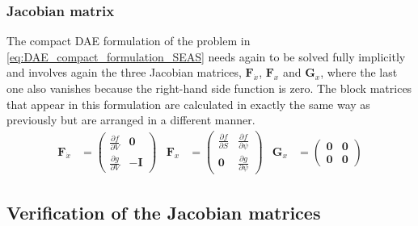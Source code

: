 \subsubsection{Jacobian matrix}
The compact DAE formulation of the problem in \autoref{eq:DAE_compact_formulation_SEAS} needs again to be solved fully implicitly and involves again the three Jacobian matrices, $\mathbf{F}_{\dot{x}}$, $\mathbf{F}_x$ and $\mathbf{G}_x$, where the last one also vanishes because the right-hand side function is zero. The block matrices that appear in this formulation are calculated in exactly the same way as previously but are arranged in a different manner.
\begin{align}
	\label{eq:Jacobian_compact_DAE}
	\mathbf{F}_{\dot{x}}&=  \begin{pmatrix}
								\frac{\partial f}{\partial V} &  \mathbf{0} \\
							    \frac{\partial g}{\partial V} & -\mathbf{I}
							\end{pmatrix} & 
	\mathbf{F}_x        &=  \begin{pmatrix}
								\frac{\partial f}{\partial S} & \frac{\partial f}{\partial \psi} \\
								\mathbf{0}                    & \frac{\partial g}{\partial \psi}
							\end{pmatrix} & 
	\mathbf{G}_x        &=  \begin{pmatrix}
								\mathbf{0} & \mathbf{0} \\
							    \mathbf{0} & \mathbf{0}
							\end{pmatrix}
\end{align}

\subsection{Verification of the Jacobian matrices}

